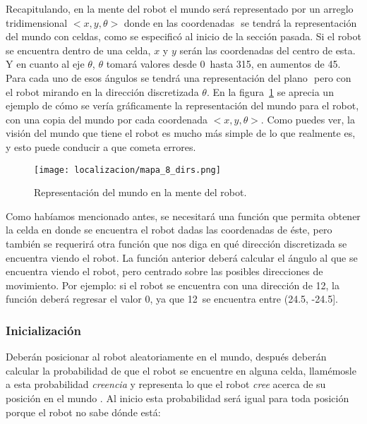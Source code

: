 Recapitulando, en la mente del robot el mundo será representado por un arreglo tridimensional \(<x,y,\theta>\) donde en las coordenadas \(<x,y>\) se tendrá la representación del mundo con celdas, como se especificó al inicio de la sección pasada. Si el robot se encuentra dentro de una celda, \(x\) y \(y\) serán las coordenadas del centro de esta. Y en cuanto al eje \(\theta\), \(\theta\) tomará valores desde 0\degree \ hasta 315\degree, en aumentos de 45\degree. Para cada uno de esos ángulos se tendrá una representación del plano \(<x,y>\) pero con el robot mirando en la dirección discretizada \(\theta\). En la figura~\ref{fig:mapa2} se aprecia un ejemplo de cómo se vería gráficamente la representación del mundo para el robot, con una copia del mundo por cada coordenada \(<x,y,\theta>\). Como puedes ver, la visión del mundo que tiene el robot es mucho más simple de lo que realmente es, y esto puede conducir a que cometa errores.

\begin{figure}
  \centering
  \texttt{[image: localizacion/mapa\_8\_dirs.png]}
  \caption{Representación del mundo en la mente del robot.}
  \label{fig:mapa2}
\end{figure}

Como habíamos mencionado antes, se necesitará una función que permita obtener la celda en donde se encuentra el robot dadas las coordenadas de éste, pero también se requerirá otra función que nos diga en qué dirección discretizada se encuentra viendo el robot. La función anterior deberá calcular el ángulo al que se encuentra viendo el robot, pero centrado sobre las posibles direcciones de movimiento. Por ejemplo: si el robot se encuentra con una dirección de 12\degree, la función deberá regresar el valor 0\degree, ya que 12\degree \ se encuentra entre (24.5\degree, -24.5\degree].\par

\subsubsection{Inicialización}

Deberán posicionar al robot aleatoriamente en el mundo, después deberán calcular la probabilidad de que el robot se encuentre en alguna celda, llamémosle a esta probabilidad \textit{creencia} y representa lo que el robot \textit{cree} acerca de su posición en el mundo \parencite{Dieter1999}. Al inicio esta probabilidad será igual para toda posición porque el robot no sabe dónde está:

